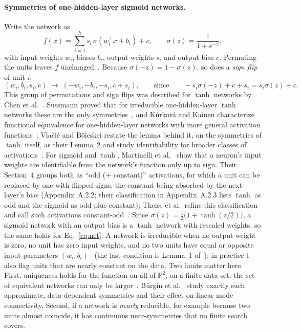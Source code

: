 \documentclass[11pt]{article}
\begin{document}
\paragraph{Symmetries of one-hidden-layer sigmoid networks.} Write the network as
\begin{equation}
f(x) = \sum_{i=1}^{h} s_i\, \sigma(w_i^\top x + b_i) + c, \qquad \sigma(z) = \frac{1}{1+e^{-z}},
\label{eq:net}
\end{equation}
with input weights $w_i$, biases $b_i$, output weights $s_i$ and output bias $c$. Permuting the units leaves $f$ unchanged~\cite{hechtnielsen1990algebraic}. Because $\sigma(-z) = 1-\sigma(z)$, so does a \emph{sign flip} of unit $i$:
\begin{equation}
(w_i, b_i, s_i, c) \;\mapsto\; (-w_i, -b_i, -s_i, c + s_i), \qquad\text{since}\qquad -s_i\sigma(-z) + c + s_i = s_i\sigma(z) + c .
\label{eq:flip}
\end{equation}
This group of permutations and sign flips was described for $\tanh$ networks by Chen et al.~\cite{chen1993geometry}. Sussmann proved that for irreducible one-hidden-layer $\tanh$ networks these are the only symmetries~\cite{sussmann1992uniqueness}, and Kůrková and Kainen characterize functional equivalence for one-hidden-layer networks with more general activation functions~\cite{kurkova1994functionally}; Vla\v{c}i\'c and B\"olcskei restate the lemma behind it, on the symmetries of $\tanh$ itself, as their Lemma~2 and study identifiability for broader classes of activations~\cite{vlacic2020affine}. For sigmoid and $\tanh$, Martinelli et al.~\cite{martinelli2024expand} show that a neuron's input weights are identifiable from the network's function only up to sign. Their Section~4 groups both as ``odd (+ constant)'' activations, for which a unit can be replaced by one with flipped signs, the constant being absorbed by the next layer's bias (Appendix~A.2.2; their classification in Appendix~A.2.3 lists $\tanh$ as odd and the sigmoid as odd plus constant); Theiss et al.\ refine this classification and call such activations constant-odd~\cite[Appendix~B.3]{theiss2026parameter}. Since $\sigma(z) = \tfrac12\big(1+\tanh(z/2)\big)$, a sigmoid network with an output bias is a $\tanh$ network with rescaled weights, so the same holds for Eq.~\eqref{eq:net}. A network is irreducible when no output weight is zero, no unit has zero input weights, and no two units have equal or opposite input parameters $(w_i, b_i)$~\cite{sussmann1992uniqueness} (the last condition is Lemma~1 of~\cite{vlacic2020affine}); in practice I also flag units that are nearly constant on the data. Two limits matter here. First, uniqueness holds for the function on all of $\mathbb{R}^2$; on a finite data set, the set of equivalent networks can only be larger~\cite[Section~I-A]{vlacic2020affine}. Bürgin et al.~\cite{burgin2026beyond} study exactly such approximate, data-dependent symmetries and their effect on linear mode connectivity. Second, if a network is \emph{nearly} reducible, for example because two units almost coincide, it has continuous near-symmetries that no finite search covers.
\end{document}
